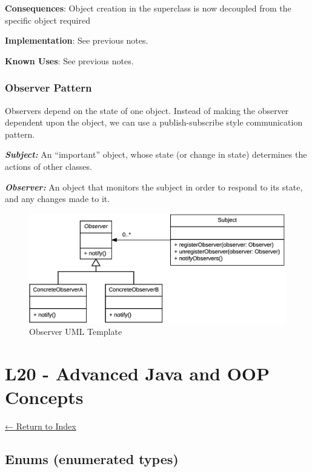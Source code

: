 \documentclass[]{article}
\begin{document}
\textbf{Consequences}: Object creation in the superclass is now
decoupled from the specific object required

\textbf{Implementation}: See previous notes.

\textbf{Known Uses}: See previous notes.

\hypertarget{observer-pattern}{%
\subsubsection{Observer Pattern}\label{observer-pattern}}

Observers depend on the state of one object. Instead of making the
observer dependent upon the object, we can use a publish-subscribe style
communication pattern.

\textbf{\emph{Subject:}} An ``important'' object, whose state (or change
in state) determines the actions of other classes.

\textbf{\emph{Observer:}} An object that monitors the subject in order
to respond to its state, and any changes made to it.

\begin{figure}
\centering
\includegraphics{images/observeruml.png}
\caption{Observer UML Template}
\end{figure}

\hypertarget{l20---advanced-java-and-oop-concepts}{%
\section{L20 - Advanced Java and OOP
Concepts}\label{l20---advanced-java-and-oop-concepts}}

\protect\hyperlink{table-of-contents}{← Return to Index}

\hypertarget{enums-enumerated-types}{%
\subsection{Enums (enumerated types)}\label{enums-enumerated-types}}
\end{document}

